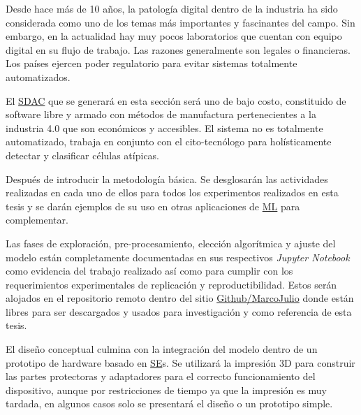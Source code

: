 Desde hace más de 10 años, la patología digital dentro de la industria ha sido
considerada como uno de los temas más importantes y fascinantes del campo. Sin
embargo, en la actualidad hay muy pocos laboratorios que cuentan con equipo
digital en su flujo de trabajo. Las razones generalmente son legales o
financieras. Los países ejercen poder regulatorio para evitar sistemas
totalmente automatizados.

El \hyperlink{abbr}{SDAC} que se generará en esta sección será uno de bajo
costo, constituido de software libre y armado con métodos de manufactura
pertenecientes a la industria 4.0 que son económicos y accesibles. El sistema no
es totalmente automatizado, trabaja en conjunto con el cito-tecnólogo para
holísticamente detectar y clasificar células atípicas.

Después de introducir la metodología básica. Se desglosarán las actividades
realizadas en cada uno de ellos para todos los experimentos realizados en esta
tesis y se darán ejemplos de su uso en otras aplicaciones de
\hyperlink{abbr}{ML} para complementar.

Las fases de exploración, pre-procesamiento, elección algorítmica y ajuste del
modelo están completamente documentadas en sus respectivos \emph{Jupyter
Notebook} como evidencia del trabajo realizado así como para cumplir con los
requerimientos experimentales de replicación y reproductibilidad. Estos serán
alojados en el repositorio remoto dentro del sitio
\hyperlink{https://github.com/marcojulioarg/ConvoPap}{Github/MarcoJulio} donde
están libres para ser descargados y usados para investigación y como referencia
de esta tesis.

El diseño conceptual culmina con la integración del modelo dentro de un
prototipo de hardware basado en \hyperlink{abbr}{SE}s. Se utilizará la impresión
3D para construir las partes protectoras y adaptadores para el correcto
funcionamiento del dispositivo, aunque por restricciones de tiempo ya que la
impresión es muy tardada, en algunos casos solo se presentará el diseño o un
prototipo simple.
